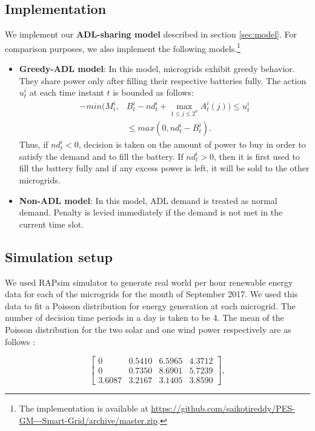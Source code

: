 \subsection{Implementation}
We implement our \textbf{ADL-sharing model} described in section \ref{sec:model}. For comparison purposes, we also implement the following models.\footnote{The implementation is available at \url{https://github.com/saikotireddy/PES-GM---Smart-Grid/archive/master.zip}.} 
\begin{itemize}
	\item \textbf{Greedy-ADL model}: In this model, microgrids exhibit greedy behavior. They share power only after filling their respective batteries fully. The action $u_t^i$ at each time instant $t$ is bounded as follows:  
	\begin{align}
	-min(M_t^i, & B_t^i - nd_t^i + \max_{1\leq j \leq 2^n} A_t^i(j) ) \leq u_t^i \nonumber\\ &\leq max(0, nd_t^i - B_t^i).
	\end{align}
	Thus, if $ nd_t^i < 0$, decision is taken on the amount of power to buy in order to satisfy the demand and to fill the battery. If $ nd_t^i > 0$, then it is first used to fill the battery fully and if any excess power is left, it will be sold to the other microgrids.
	
	\item \textbf{Non-ADL model}:  In this model, ADL demand is treated as normal demand. Penalty is levied immediately if the demand is not met in the current time slot.
\end{itemize}
\subsection{Simulation setup}
We used RAPsim simulator to generate real world per hour renewable energy data for each of the microgrids  for the month of September 2017. We used this data to fit a Poisson distribution for energy generation at each microgrid. The number of decision time periods in a day is taken to be 4. The mean of the Poisson distribution for the two solar and one wind power respectively are as follows :

$$ \left[ \begin{array}{ccccc}
	0 & 0.5410 & 6.5965 & 4.3712 \\
	0 & 0.7350 & 8.6901 & 5.7239 \\
	3.6087 & 3.2167 & 3.1405 & 3.8590
\end{array} \right],$$

